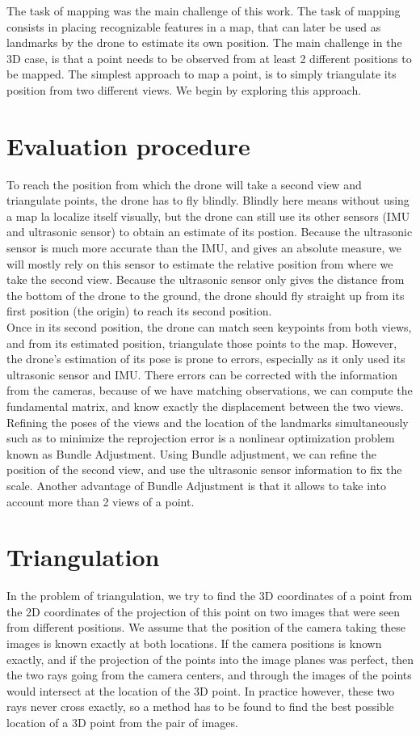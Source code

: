 The task of mapping was the main challenge of this work. The task of mapping consists in placing recognizable features in a map, that can later be used as landmarks by the drone to estimate its own position. The main challenge in the 3D case, is that a point needs to be observed from at least 2 different positions to be mapped. The simplest approach to map a point, is to simply triangulate its position from two different views. We begin by exploring this approach.

\section{Evaluation procedure} \label{evalproc}
To reach the position from which the drone will take a second view and triangulate points, the drone has to fly blindly. Blindly here means without using a map la localize itself visually, but the drone can still use its other sensors (IMU and ultrasonic sensor) to obtain an estimate of its postion. Because the ultrasonic sensor is much more accurate than the IMU, and gives an absolute measure, we will mostly rely on this sensor to estimate the relative position from where we take the second view. Because the ultrasonic sensor only gives the distance from the bottom of the drone to the ground, the drone should fly straight up from its first position (the origin) to reach its second position.\\
Once in its second position, the drone can match seen keypoints from both views, and from its estimated position, triangulate those points to the map. However, the drone's estimation of its pose is prone to errors, especially as it only used its ultrasonic sensor and IMU. There errors can be corrected with the information from the cameras, because of we have %
matching observations, we can compute the fundamental matrix, and know exactly the displacement between the two views. Refining the poses of the views and the location of the landmarks simultaneously such as to minimize the reprojection error is a nonlinear optimization problem known as Bundle Adjustment. Using Bundle adjustment, we can refine the position of the second view, and use the ultrasonic sensor information to fix the scale. Another advantage of Bundle Adjustment is that it allows to take into account more than 2 views of a point.


\section{Triangulation}
In the problem of triangulation, we try to find the 3D coordinates of a point from the 2D coordinates of the projection of this point on two images that were seen from different positions. We assume that the position of the camera taking these images is known exactly at both locations. If the camera positions is known exactly, and if the projection of the points into the image planes was perfect, then the two rays going from the camera centers, and through the images of the points would intersect at the location of the 3D point. In practice however, these two rays never cross exactly, so a method has to be found to find the best possible location of a 3D point from the pair of images.

